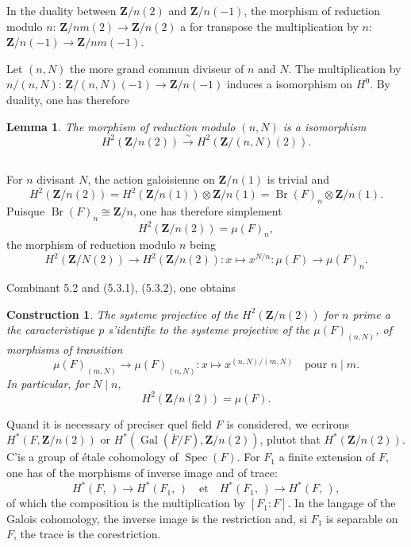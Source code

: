 \documentclass[11pt,a4paper]{article}
\theoremstyle{plain}
\newtheorem{lemma}[theorem]{Lemma}
\newtheorem{construction}[theorem]{Construction}
\theoremstyle{definition}
\DeclareMathOperator{\Gal}{Gal}
\DeclareMathOperator{\Spec}{Spec}
\DeclareMathOperator{\Br}{Br}
\begin{document}
In the duality between $\mathbf{Z}/n(2)$ and $\mathbf{Z}/n(-1)$, the morphism of reduction modulo $n$: $\mathbf{Z}/nm(2) \to \mathbf{Z}/n(2)$ a for transpose the multiplication by $n$: $\mathbf{Z}/n(-1) \to \mathbf{Z}/nm(-1)$.

Let $(n, N)$ the more grand commun diviseur of $n$ and $N$. The multiplication by $n/(n, N)$: $\mathbf{Z}/(n, N)(-1) \to \mathbf{Z}/n(-1)$ induces a isomorphism on $H^0$. By duality, one has therefore

\begin{lemma}\label{5.2}
The morphism of reduction modulo $(n, N)$ is a isomorphism
\[
H^2(\mathbf{Z}/n(2)) \xrightarrow{\sim} H^2(\mathbf{Z}/(n, N)(2)).
\]
\end{lemma}

\subsection{}\label{5.3}

For $n$ divisant $N$, the action galoisienne on $\mathbf{Z}/n(1)$ is trivial and
\[
H^2(\mathbf{Z}/n(2)) = H^2(\mathbf{Z}/n(1)) \otimes \mathbf{Z}/n(1) = \Br(F)_n \otimes \mathbf{Z}/n(1).
\]
Puisque $\Br(F)_n \cong \mathbf{Z}/n$, one has therefore simplement
\begin{equation}\label{5.3.1}
H^2(\mathbf{Z}/n(2)) = \mu(F)_n,
\end{equation}
the morphism of reduction modulo $n$ being
\begin{equation}\label{5.3.2}
H^2(\mathbf{Z}/N(2)) \to H^2(\mathbf{Z}/n(2)) : x \mapsto x^{N/n} : \mu(F) \to \mu(F)_n.
\end{equation}

Combinant 5.2 and (5.3.1), (5.3.2), one obtains

\begin{construction}\label{5.4}
The systeme projective of the $H^2(\mathbf{Z}/n(2))$ for $n$ prime a the caracteristique $p$ s'identifie to the systeme projective of the $\mu(F)_{(n,N)}$, of morphisms of transition
\[
\mu(F)_{(m,N)} \to \mu(F)_{(n,N)} : x \mapsto x^{(n,N)/(m,N)} \quad \text{pour } n \mid m.
\]
In particular, for $N \mid n$,
\begin{equation}\label{5.4.1}
H^2(\mathbf{Z}/n(2)) = \mu(F).
\end{equation}
\end{construction}

Quand it is necessary of preciser quel field $F$ is considered, we ecrirons $H^*(F, \mathbf{Z}/n(2))$ or $H^*(\Gal(\overline{F}/F), \mathbf{Z}/n(2))$, plutot that $H^*(\mathbf{Z}/n(2))$. C'is a group of étale cohomology of $\Spec(F)$. For $F_1$ a finite extension of $F$, one has of the morphisms of inverse image and of trace:
\[
H^*(F, \,) \to H^*(F_1, \,) \quad \text{et} \quad H^*(F_1, \,) \to H^*(F, \,),
\]
of which the composition is the multiplication by $[F_1 : F]$. In the langage of the Galois cohomology, the inverse image is the restriction and, si $F_1$ is separable on $F$, the trace is the corestriction.
\end{document}

